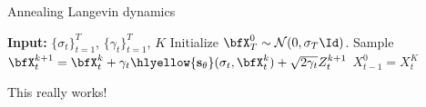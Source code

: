 \begin{frame}{Annealing Langevin dynamics}
%
\vspace{-.2em}
  \begin{algorithm}[H]
  \begin{algorithmic}[1]
  \small
    \State \textbf{Input:} $\{\sigma_t\}_{t=1}^T$, $\{\gamma_t\}_{t=1}^T$, $K$
    \State Initialize $\bfX_{T}^0 \sim \mathcal{N}(0, \sigma_T \Id)$.
    \State Sample $\bfX_{t}^{k+1} = \bfX_{t}^k + \gamma_t \hlyellow{\mathbf{s}_\theta}(\sigma_t, \bfX_t^k) + \sqrt{2 \gamma_t} Z_t^{k+1}$
    \EndFor
    \State $X_{t-1}^0 = X_{t}^K$
    \EndFor
\end{algorithmic}
\caption{\small Sampling of annealing Langevin dynamics}
\label{alg:seq}
\end{algorithm}
\vspace{-1.2em}
   
\end{frame}


\begin{frame}{This really works!}
    \begin{center}
        \hspace{2em}
    \end{center}
\end{frame}

